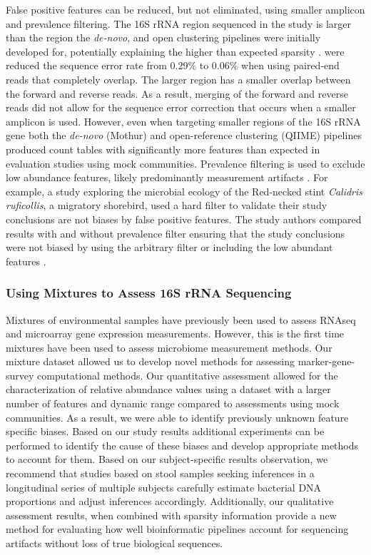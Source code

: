 \documentclass{bmcart}
\begin{document}
False positive features can be reduced, but not eliminated, using
smaller amplicon and prevalence filtering. The 16S rRNA region sequenced
in the study is larger than the region the \emph{de-novo}, and open
clustering pipelines were initially developed for, potentially
explaining the higher than expected sparsity
\cite{kozich2013development}. \cite{kozich2013development} were
reduced the sequence error rate from 0.29\% to 0.06\% when using
paired-end reads that completely overlap. The larger region has a
smaller overlap between the forward and reverse reads. As a result,
merging of the forward and reverse reads did not allow for the sequence
error correction that occurs when a smaller amplicon is used. However,
even when targeting smaller regions of the 16S rRNA gene both the
\emph{de-novo} (Mothur) and open-reference clustering (QIIME) pipelines
produced count tables with significantly more features than expected in
evaluation studies using mock communities. Prevalence filtering is used
to exclude low abundance features, likely predominantly measurement
artifacts \cite{callahan2016}. For example, a study exploring the
microbial ecology of the Red-necked stint \emph{Calidris ruficollis}, a
migratory shorebird, used a hard filter to validate their study
conclusions are not biases by false positive features. The study authors
compared results with and without prevalence filter ensuring that the
study conclusions were not biased by using the arbitrary filter or
including the low abundant features \cite{risely2017gut}.


\subsubsection*{Using Mixtures to Assess 16S rRNA
Sequencing}

Mixtures of environmental samples have previously been used to assess
RNAseq and microarray gene expression measurements. However, this is the
first time mixtures have been used to assess microbiome measurement
methods. Our mixture dataset allowed us to develop novel methods for
assessing marker-gene-survey computational methods. Our quantitative
assessment allowed for the characterization of relative abundance values
using a dataset with a larger number of features and dynamic range
compared to assessments using mock communities. As a result, we were
able to identify previously unknown feature specific biases. Based on
our study results additional experiments can be performed to identify
the cause of these biases and develop appropriate methods to account for
them. Based on our subject-specific results observation, we recommend
that studies based on stool samples seeking inferences in a longitudinal
series of multiple subjects carefully estimate bacterial DNA proportions
and adjust inferences accordingly. Additionally, our qualitative
assessment results, when combined with sparsity information provide a
new method for evaluating how well bioinformatic pipelines account for
sequencing artifacts without loss of true biological sequences.
\end{document}
